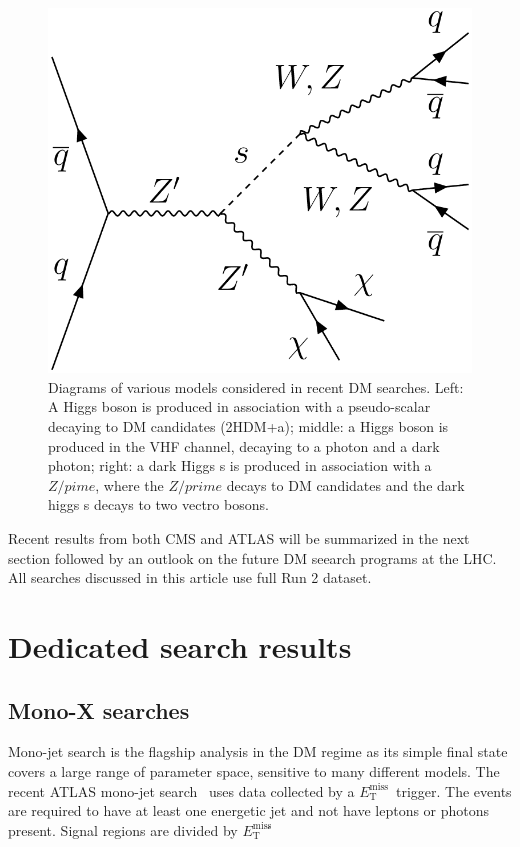 \documentclass{moriond}
\def\et{E_\textrm{T}^{\textrm{miss}}}
\begin{document}
\begin{figure} [htb]
\begin{minipage}{0.32\linewidth}
\end{minipage}
\begin{minipage}{0.32\linewidth}
\centerline{\includegraphics[width=0.9\linewidth]{MonoSVVDiagram}}
\end{minipage}
\caption[]{Diagrams of various models considered in recent DM searches. Left: A Higgs boson is produced in association with a pseudo-scalar decaying to DM candidates (2HDM+a); middle: a Higgs boson is produced in the VHF channel, decaying to a photon and a dark photon; right: a dark Higgs s is produced in association with a $Z/pime$, where the $Z/prime$ decays to DM candidates and the dark higgs s decays to two vectro bosons.}
\label{fig:diagrams}
\end{figure}

Recent results from both CMS and ATLAS will be summarized in the next section
followed by an outlook on the future DM seearch programs at the LHC. All
searches discussed in this article use full Run 2 dataset. 

\section{Dedicated search results}

\subsection{Mono-X searches}

Mono-jet search is the flagship analysis in the DM regime as its simple final
state covers a large range of parameter space, sensitive to many different
models. The recent ATLAS mono-jet search~\cite{monojet} uses data collected by a $\et$\
trigger. The events are required to have at least one energetic jet and not
have leptons or photons present. Signal regions are divided by $\et$\.
\end{document}
